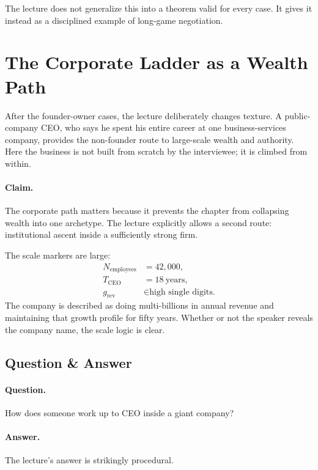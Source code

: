 The lecture does not generalize this into a theorem valid for every case. It gives it instead as a disciplined example of long-game negotiation.

\section{The Corporate Ladder as a Wealth Path}

After the founder-owner cases, the lecture deliberately changes texture. A public-company CEO, who says he spent his entire career at one business-services company, provides the non-founder route to large-scale wealth and authority. Here the business is not built from scratch by the interviewee; it is climbed from within.

\paragraph{Claim.} The corporate path matters because it prevents the chapter from collapsing wealth into one archetype. The lecture explicitly allows a second route: institutional ascent inside a sufficiently strong firm.

The scale markers are large:
\begin{align}
N_{\mathrm{employees}} &= 42{,}000,\\
T_{\mathrm{CEO}} &= 18\ \mathrm{years},\\
g_{\mathrm{rev}} &\in \text{high single digits.}
\end{align}
The company is described as doing multi-billions in annual revenue and maintaining that growth profile for fifty years. Whether or not the speaker reveals the company name, the scale logic is clear.

\subsection{Question \& Answer}

\paragraph{Question.} How does someone work up to CEO inside a giant company?

\paragraph{Answer.} The lecture's answer is strikingly procedural.

